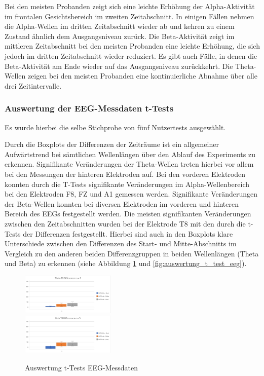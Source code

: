 \documentclass[conference]{IEEEtran}
\begin{document}
Bei den meisten Probanden zeigt sich eine leichte Erhöhung der Alpha-Aktivität im frontalen Gesichtsbereich im zweiten Zeitabschnitt. In einigen Fällen nehmen die Alpha-Wellen im dritten Zeitabschnitt wieder ab und kehren zu einem Zustand ähnlich dem Ausgangsniveau zurück. Die Beta-Aktivität zeigt im mittleren Zeitabschnitt bei den meisten Probanden eine leichte Erhöhung, die sich jedoch im dritten Zeitabschnitt wieder reduziert. Es gibt auch Fälle, in denen die Beta-Aktivität am Ende wieder auf das Ausgangsniveau zurückkehrt. Die Theta-Wellen zeigen bei den meisten Probanden eine kontinuierliche Abnahme über alle drei Zeitintervalle.

\subsubsection{Auswertung der EEG-Messdaten t-Tests}
Es wurde hierbei die selbe Stichprobe von fünf Nutzertests ausgewählt.

Durch die Boxplots der Differenzen der Zeiträume ist ein allgemeiner Aufwärtstrend bei sämtlichen Wellenlängen über den Ablauf des Experiments zu erkennen. Signifikante Veränderungen der Theta-Wellen treten hierbei vor allem bei den Messungen der hinteren Elektroden auf. Bei den vorderen Elektroden konnten durch die T-Tests signifikante Veränderungen im Alpha-Wellenbereich bei den Elektroden F8, FZ und A1 gemessen werden. Signifikante Veränderungen der Beta-Wellen konnten bei diversen Elektroden im vorderen und hinteren Bereich des EEGs festgestellt werden. Die meisten signifikanten Veränderungen zwischen den Zeitabschnitten wurden bei der Elektrode T8 mit den durch die t-Tests der Differenzen festgestellt. Hierbei sind auch in den Boxplots klare Unterschiede zwischen den Differenzen des Start- und Mitte-Abschnitts im Vergleich zu den anderen beiden Differenzgruppen in beiden Wellenlängen (Theta und Beta) zu erkennen (siehe Abbildung \ref{fig:boxplots_eeg} und \ref{fig:auswertung_t_test_eeg}).

\begin{figure}[ht]
	\centering
	
	\includegraphics[width=0.4\textwidth]{assets/ThetaT8.png} \\
	\vspace{2pt}
	\includegraphics[width=0.4\textwidth]{assets/BetaT8.png} \hspace{-5pt}
	\caption{Auswertung t-Tests EEG-Messdaten}
	\label{fig:boxplots_eeg}
\end{figure}
\end{document}
